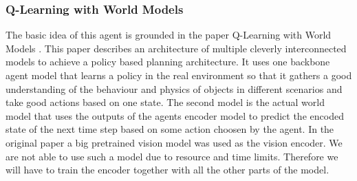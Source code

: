 \documentclass[article, 10pt]{IEEEtran}
\begin{document}




\subsubsection{Q-Learning with World Models}

The basic idea of this agent is grounded in the paper Q-Learning with World Models \cite{dong2026qwm}. This paper describes an architecture of multiple cleverly interconnected models to achieve a policy based planning architecture. It uses one backbone agent model that learns a policy in the real environment so that it gathers a good understanding of the behaviour and physics of objects in different scenarios and take good actions based on one state. The second model is the actual world model that uses the outputs of the agents encoder model to predict the encoded state of the next time step based on some action choosen by the agent. In the original paper a big pretrained vision model was used as the vision encoder. We are not able to use such a model due to resource and time limits. Therefore we will have to train the encoder together with all the other parts of the model.
\end{document}
